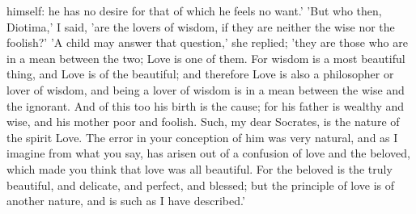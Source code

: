 himself: he has no desire for that of which he feels no want.' 'But who then, Diotima,' I said, 'are the lovers of wisdom, if they are neither the wise nor the foolish?' 'A child may answer that question,' she replied; 'they are those who are in a mean between the two; Love is one of them. For wisdom is a most beautiful thing, and Love is of the beautiful; and therefore Love is also a philosopher or lover of wisdom, and being a lover of wisdom is in a mean between the wise and the ignorant. And of this too his birth is the cause; for his father is wealthy and wise, and his mother poor and foolish. Such, my dear Socrates, is the nature of the spirit Love. The error in your conception of him was very natural, and as I imagine from what you say, has arisen out of a confusion of love and the beloved, which made you think that love was all beautiful. For the beloved is the truly beautiful, and delicate, and perfect, and blessed; but the principle of love is of another nature, and is such as I have described.'

